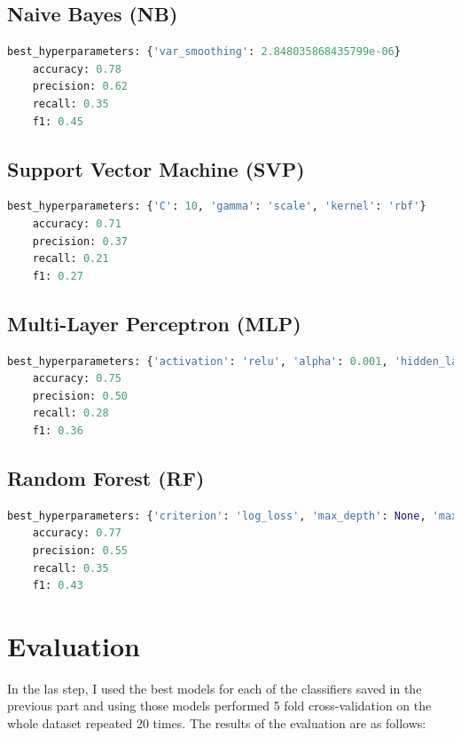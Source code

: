 \documentclass{article}
\begin{document}
\subsection{Naive Bayes (NB)}
\begin{lstlisting}[language=Python, basicstyle=\small\ttfamily, frame=single, breaklines=true]
    best_hyperparameters: {'var_smoothing': 2.848035868435799e-06}
    accuracy: 0.78
    precision: 0.62
    recall: 0.35
    f1: 0.45
\end{lstlisting}
\subsection{Support Vector Machine (SVP)}
\begin{lstlisting}[language=Python, basicstyle=\small\ttfamily, frame=single, breaklines=true]
    best_hyperparameters: {'C': 10, 'gamma': 'scale', 'kernel': 'rbf'}
    accuracy: 0.71
    precision: 0.37
    recall: 0.21
    f1: 0.27
\end{lstlisting}
\subsection{Multi-Layer Perceptron (MLP)}
\begin{lstlisting}[language=Python, basicstyle=\small\ttfamily, frame=single, breaklines=true]
    best_hyperparameters: {'activation': 'relu', 'alpha': 0.001, 'hidden_layer_sizes': (100,), 'learning_rate': 'adaptive', 'solver': 'sgd'}
    accuracy: 0.75
    precision: 0.50
    recall: 0.28
    f1: 0.36
\end{lstlisting}
\subsection{Random Forest (RF)}
\begin{lstlisting}[language=Python, basicstyle=\small\ttfamily, frame=single, breaklines=true]
    best_hyperparameters: {'criterion': 'log_loss', 'max_depth': None, 'max_features': 'log2', 'min_samples_leaf': 5, 'n_estimators': 10}
    accuracy: 0.77
    precision: 0.55
    recall: 0.35
    f1: 0.43
\end{lstlisting}

\section{Evaluation}
In the las step, I used the best models for each of the classifiers saved in the previous part
and using those models performed 5 fold cross-validation on the whole dataset repeated 20 times. The results of the evaluation are as follows:
\end{document}
